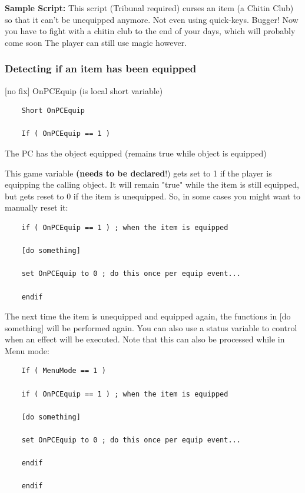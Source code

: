 \textbf{Sample Script:} This script (Tribunal required) curses an item
(a Chitin Club) so that it can't be unequipped anymore. Not even using
quick-keys. Bugger! Now you have to fight with a chitin club to the end
of your days, which will probably come soon The player can still use
magic however.



\hypertarget{detecting-if-an-item-has-been-equipped}{%
\subsubsection{Detecting if an item has been
equipped}\label{detecting-if-an-item-has-been-equipped}}

{[}no fix{]} OnPCEquip (is local short variable)

\begin{lstlisting}
	Short OnPCEquip
	
	If ( OnPCEquip == 1 )
\end{lstlisting}

The PC has the object equipped (remains true while object is equipped)

This game variable \textbf{(needs to be declared}!) gets set to 1 if the
player is equipping the calling object. It will remain "true" while the
item is still equipped, but gets reset to 0 if the item is unequipped.
So, in some cases you might want to manually reset it:

\begin{lstlisting}
	if ( OnPCEquip == 1 ) ; when the item is equipped
	
	[do something]
	
	set OnPCEquip to 0 ; do this once per equip event...
	
	endif
\end{lstlisting}

The next time the item is unequipped and equipped again, the functions
in {[}do something{]} will be performed again. You can also use a status
variable to control when an effect will be executed. Note that this can
also be processed while in Menu mode:

\begin{lstlisting}
	If ( MenuMode == 1 )
	
	if ( OnPCEquip == 1 ) ; when the item is equipped
	
	[do something]
	
	set OnPCEquip to 0 ; do this once per equip event...
	
	endif
	
	endif
\end{lstlisting}

